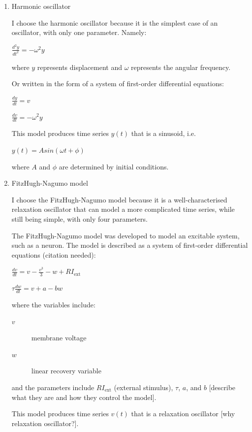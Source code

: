 \begin{enumerate}
\item Harmonic oscillator
\label{sec:org7f23d98}

I choose the harmonic oscillator because it is the simplest case of an oscillator, with only one parameter.  Namely:

\(\frac{d^{2}y}{dt^{2}} = -\omega^{2}y\)

where \(y\) represents displacement and \(\omega\) represents the angular frequency.

Or written in the form of a system of first-order differential equations:

\(\frac{dy}{dt} = v\)

\(\frac{dv}{dt} = -\omega^{2}y\)

This model produces time series \(y(t)\) that is a sinusoid, i.e.

\(y(t) = A sin(\omega{}t + \phi)\)

where \(A\) and \(\phi\) are determined by initial conditions.

\item FitzHugh-Nagumo model
\label{sec:orgdffb616}

I choose the FitzHugh-Nagumo model because it is a well-characterised relaxation oscillator that can model a more complicated time series, while still being simple, with only four parameters.

The FitzHugh-Nagumo model was developed to model an excitable system, such as a neuron.  The model is described as a system of first-order differential equations (citation needed):

\(\frac{dv}{dt} = v - \frac{v^3}{3} - w + RI_{\mathrm{ext}}\)

\(\tau \frac{dw}{dt} = v + a - bw\)

where the variables include:
\begin{description}
\item[{\(v\)}] membrane voltage
\item[{\(w\)}] linear recovery variable
\end{description}

and the parameters include \(RI_{\mathrm{ext}}\) (external stimulus), \(\tau\), \(a\), and \(b\) [describe what they are and how they control the model].

This model produces time series \(v(t)\) that is a relaxation oscillator [why relaxation oscillator?].
\end{enumerate}


